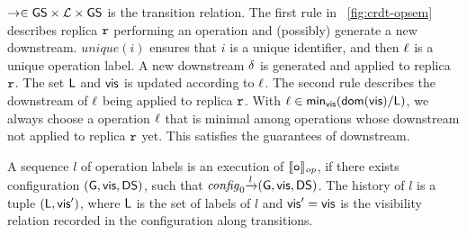 $\rightarrow \in \mathsf{GS} \times \mathcal{L} \times \mathsf{GS}$ is the transition relation. The first rule in \figurename~\ref{fig:crdt-opsem} describes replica $\mathtt{r}$ performing an operation and (possibly) generate a new downstream. $\mathit{unique}(i)$ ensures that $i$ is a unique identifier, and then $\ell$ is a unique operation label. A new downstream $\delta$ is generated and applied to replica $\mathtt{r}$. The set $\mathsf{L}$ and $\mathsf{vis}$ is updated according to $\ell$. The second rule describes the downstream of $\ell$ being applied to replica $\mathtt{r}$. With $\ell \in \mathsf{min}_{\mathsf{vis}}(\mathsf{dom}(\mathsf{vis}) / \mathsf{L})$, we always choose a operation $\ell$ that is minimal among operations whose downstream not applied to replica $\mathtt{r}$ yet. This satisfies the guarantees of downstream. 


A sequence $l$ of operation labels is an execution of $\llbracket \mathtt{o} \rrbracket_{\mathit{op}}$, if there exists configuration $(\mathsf{G}, \mathsf{vis}, \mathsf{DS})$, such that $\mathit{config}_0 {\xrightarrow{ l }} (\mathsf{G}, \mathsf{vis}, \mathsf{DS})$. The history of $l$ is a tuple $(\mathsf{L}, \mathsf{vis}')$, where $\mathsf{L}$ is the set of labels of $l$ and $\mathsf{vis}' = \mathsf{vis}$ is the visibility relation recorded in the configuration along transitions.







